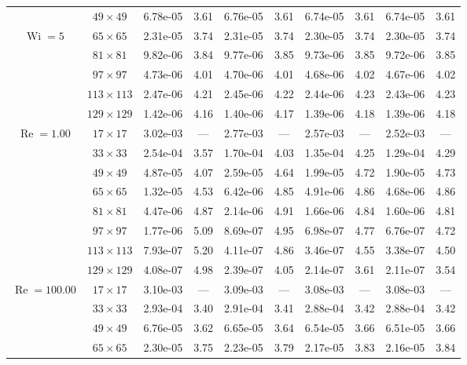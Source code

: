\documentclass[preprint, 12pt]{elsarticle}
\begin{document}
\begin{center}
\begin{table}[H]
{\begin{tabular*}{\textwidth}{@{\extracolsep\fill}cccccccccc@{}}
    & $49\times 49$ & 6.78e-05 & 3.61 & 6.76e-05 & 3.61 & 6.74e-05 & 3.61 & 6.74e-05 & 3.61 \\
    \multirow{3}{*}{$\operatorname{Wi}=5$} & $65\times 65$ & 2.31e-05 & 3.74 & 2.31e-05 & 3.74 & 2.30e-05 & 3.74 & 2.30e-05 & 3.74 \\
    & $81\times 81$ & 9.82e-06 & 3.84 & 9.77e-06 & 3.85 & 9.73e-06 & 3.85 & 9.72e-06 & 3.85 \\
    & $97\times 97$ & 4.73e-06 & 4.01 & 4.70e-06 & 4.01 & 4.68e-06 & 4.02 & 4.67e-06 & 4.02 \\
    & $113\times 113$ & 2.47e-06 & 4.21 & 2.45e-06 & 4.22 & 2.44e-06 & 4.23 & 2.43e-06 & 4.23 \\
    & $129\times 129$ & 1.42e-06 & 4.16 & 1.40e-06 & 4.17 & 1.39e-06 & 4.18 & 1.39e-06 & 4.18 \\
    \hline\hline
    \multirow{7}{*}{$\operatorname{Re}=1.00$} & $17\times 17$ & 3.02e-03 & --- & 2.77e-03 & --- & 2.57e-03 & --- & 2.52e-03 & --- \\
    & $33\times 33$ & 2.54e-04 & 3.57 & 1.70e-04 & 4.03 & 1.35e-04 & 4.25 & 1.29e-04 & 4.29 \\
    & $49\times 49$ & 4.87e-05 & 4.07 & 2.59e-05 & 4.64 & 1.99e-05 & 4.72 & 1.90e-05 & 4.73 \\
    \multirow{3}{*}{$\operatorname{Wi}=10$} & $65\times 65$ & 1.32e-05 & 4.53 & 6.42e-06 & 4.85 & 4.91e-06 & 4.86 & 4.68e-06 & 4.86 \\
    & $81\times 81$ & 4.47e-06 & 4.87 & 2.14e-06 & 4.91 & 1.66e-06 & 4.84 & 1.60e-06 & 4.81 \\
    & $97\times 97$ & 1.77e-06 & 5.09 & 8.69e-07 & 4.95 & 6.98e-07 & 4.77 & 6.76e-07 & 4.72 \\
    & $113\times 113$ & 7.93e-07 & 5.20 & 4.11e-07 & 4.86 & 3.46e-07 & 4.55 & 3.38e-07 & 4.50 \\
    & $129\times 129$ & 4.08e-07 & 4.98 & 2.39e-07 & 4.05 & 2.14e-07 & 3.61 & 2.11e-07 & 3.54 \\
    \hline
    \multirow{7}{*}{$\operatorname{Re}=100.00$} & $17\times 17$ & 3.10e-03 & --- & 3.09e-03 & --- & 3.08e-03 & --- & 3.08e-03 & --- \\
    & $33\times 33$ & 2.93e-04 & 3.40 & 2.91e-04 & 3.41 & 2.88e-04 & 3.42 & 2.88e-04 & 3.42 \\
    & $49\times 49$ & 6.76e-05 & 3.62 & 6.65e-05 & 3.64 & 6.54e-05 & 3.66 & 6.51e-05 & 3.66 \\
    \multirow{3}{*}{$\operatorname{Wi}=10$} & $65\times 65$ & 2.30e-05 & 3.75 & 2.23e-05 & 3.79 & 2.17e-05 & 3.83 & 2.16e-05 & 3.84 \\

\end{tabular*}}
\end{table}
\end{center}
\end{document}
